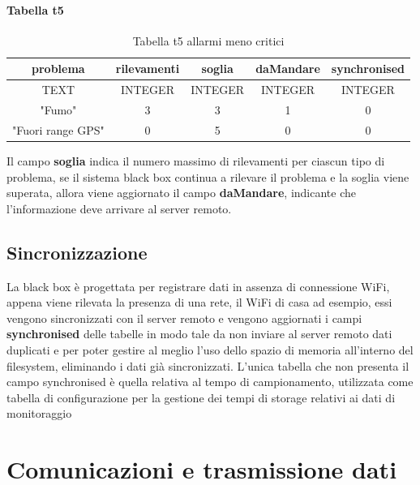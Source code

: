 \documentclass[12pt, a4paper, italian]{report}
\numberwithin{figure}{chapter}
\numberwithin{table}{chapter}
\begin{document}
\paragraph{Tabella t5}
\begin{table}[h!]
  \centering 
  \begin{adjustbox}{max width=\textwidth}
    \begin{tabular}{|c|c|c|c|c|}
      \hline
      \textbf{problema} & \textbf{rilevamenti} & \textbf{soglia} & \textbf{daMandare} & \textbf{synchronised} \\
      \hline
      TEXT & INTEGER & INTEGER & INTEGER & INTEGER \\
      \hline
      "Fumo" & 3 & 3 & 1 & 0 \\
      \hline
      "Fuori range GPS" & 0 & 5 & 0 & 0 \\
      \hline
    \end{tabular}
  \end{adjustbox}
  \caption{Tabella t5 allarmi meno critici}
  \label{tab:t5 allarmi meno critici}
\end{table}
Il campo \textbf{soglia} indica il numero massimo di rilevamenti per ciascun tipo di problema, se il sistema black box continua a rilevare il problema e la soglia viene superata, allora viene aggiornato il campo \textbf{daMandare}, indicante che l'informazione deve arrivare al server remoto.

\subsection{Sincronizzazione}
La black box è progettata per registrare dati in assenza di connessione WiFi, appena viene rilevata la presenza di una rete, il WiFi di casa ad esempio, essi vengono sincronizzati con il server remoto e vengono aggiornati i campi \textbf{synchronised} delle tabelle in modo tale da non inviare al server remoto dati duplicati e per poter gestire al meglio l'uso dello spazio di memoria all'interno del filesystem, eliminando i dati già sincronizzati. 
L'unica tabella che non presenta il campo synchronised è quella relativa al tempo di campionamento, utilizzata come tabella di configurazione per la gestione dei tempi di storage relativi ai dati di monitoraggio

\section{Comunicazioni e trasmissione dati}
\end{document}
